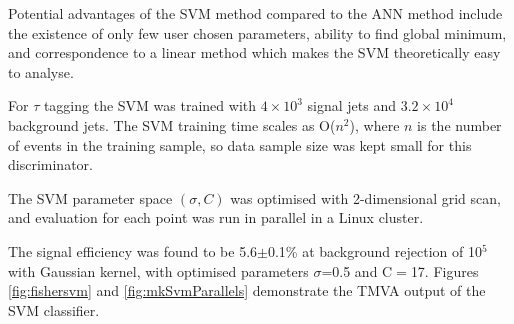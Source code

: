 \documentclass[a4paper]{jpconf}
\begin{document}
Potential advantages of the SVM method compared to the ANN method
include the existence of only few user chosen parameters, ability to find global minimum, and
correspondence to a linear method which makes the SVM theoretically easy to analyse.

For $\tau$ tagging the SVM was trained with $4\times 10^3$  signal jets and 
$3.2\times 10^4$ background jets.
The SVM training time  scales as O($n^2$), where $n$ is the number of events in the training sample,
so data sample size was kept small for this discriminator.

The SVM parameter space $(\sigma, C)$
was optimised with 2-dimensional grid scan,  
and evaluation for each point was run in parallel in a Linux cluster.


The signal efficiency was found to be 5.6$\pm$0.1\% at background rejection of 10$^5$
with Gaussian kernel, with optimised parameters $\sigma$=0.5 and C$=$17.
Figures \ref{fig:fishersvm} and \ref{fig:mkSvmParallels} demonstrate the TMVA output of the SVM classifier.


%

 
\end{document}
